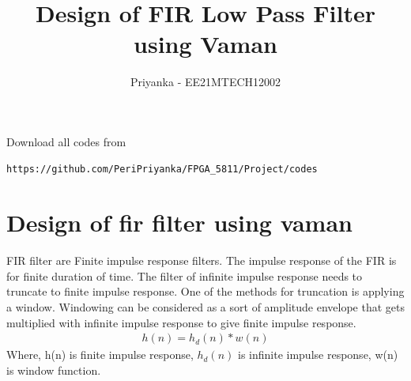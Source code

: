 \documentclass[journal,12pt,twocolumn]{IEEEtran}
\begin{document}
     \def\rightbox#1{\makebox[0in][r]{#1}}
     \def\centbox#1{\makebox[0in]{#1}}
     \def\topbox#1{\raisebox{-\baselineskip}[0in][0in]{#1}}
     \def\midbox#1{\raisebox{-0.5\baselineskip}[0in][0in]{#1}}
\vspace{3cm}
\title{Design of FIR Low Pass Filter using Vaman }
\author{Priyanka - EE21MTECH12002}
\maketitle
\newpage
\bigskip
\renewcommand{\thefigure}{\theenumi}
\renewcommand{\thetable}{\theenumi}
Download all codes from 
\begin{lstlisting}
https://github.com/PeriPriyanka/FPGA_5811/Project/codes
\end{lstlisting}
\section{Design of fir filter using vaman}
FIR filter are Finite impulse response filters. The impulse response of the FIR is for finite duration of time.  The filter of infinite impulse response needs to truncate to finite impulse response. One of the methods for truncation is applying a window.  Windowing can be considered as a sort of amplitude envelope that gets multiplied with infinite impulse response to give finite impulse response. 
\begin{align}
h(n) = h_d(n) * w(n) 
\end{align}
Where, 
h(n) is finite impulse response,
$h_d(n)$ is infinite impulse response,
w(n) is window function.
\end{document}
